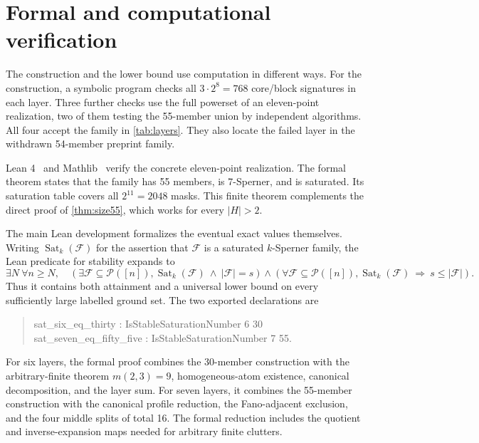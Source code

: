 \documentclass[11pt]{article}
\theoremstyle{definition}
\theoremstyle{remark}
\newcommand{\powerset}{\mathcal{P}}
\begin{document}
\section{Formal and computational verification}
\label{sec:verification}

The construction and the lower bound use computation in different ways.  For
the construction, a symbolic program checks all $3\cdot2^8=768$ core/block
signatures in each layer.  Three further checks use the full powerset of an
eleven-point realization, two of them testing the 55-member union by
independent algorithms.  All four accept the family in \cref{tab:layers}.
They also locate the failed layer in the withdrawn 54-member preprint family.

Lean 4~\cite{lean4} and Mathlib~\cite{mathlib2020} verify the concrete
eleven-point realization.  The formal theorem states that the family has 55
members, is 7-Sperner, and is saturated.  Its saturation table covers all
$2^{11}=2048$ masks.  This finite theorem complements the direct proof of
\cref{thm:size55}, which works for every $|H|>2$.

The main Lean development formalizes the eventual exact values themselves.
Writing $\operatorname{Sat}_k(\mathcal F)$ for the assertion that
$\mathcal F$ is a saturated $k$-Sperner family, the Lean predicate for
stability expands to
\[
  \exists N\ \forall n\geq N,\quad
  \left(\exists\mathcal F\subseteq\powerset([n]),
    \operatorname{Sat}_k(\mathcal F)\ \land\ |\mathcal F|=s\right)
  \land
  \left(\forall\mathcal F\subseteq\powerset([n]),
    \operatorname{Sat}_k(\mathcal F)\ \Longrightarrow\ s\leq|\mathcal F|\right).
\]
Thus it contains both attainment and a universal lower bound on every
sufficiently large labelled ground set.  The two exported declarations are
\begin{quote}\small\ttfamily
sat\_six\_eq\_thirty : IsStableSaturationNumber 6 30\\
sat\_seven\_eq\_fifty\_five : IsStableSaturationNumber 7 55.
\end{quote}

For six layers, the formal proof combines the 30-member construction with the
arbitrary-finite theorem $m(2,3)=9$, homogeneous-atom existence, canonical
decomposition, and the layer sum.  For seven layers, it combines the
55-member construction with the canonical profile reduction, the
Fano-adjacent exclusion, and the four middle splits of total 16.  The formal
reduction includes the quotient and inverse-expansion maps needed for
arbitrary finite clutters.
\end{document}
